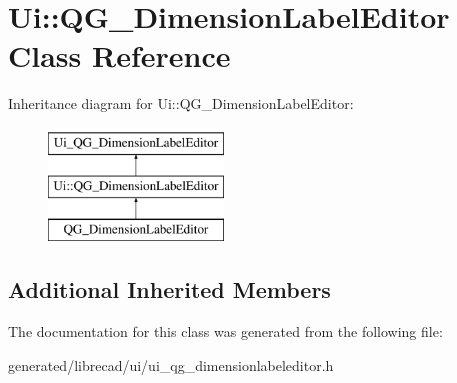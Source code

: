 \hypertarget{classUi_1_1QG__DimensionLabelEditor}{\section{Ui\-:\-:Q\-G\-\_\-\-Dimension\-Label\-Editor Class Reference}
\label{classUi_1_1QG__DimensionLabelEditor}
}
Inheritance diagram for Ui\-:\-:Q\-G\-\_\-\-Dimension\-Label\-Editor\-:\begin{figure}[H]
\begin{center}
\leavevmode
\includegraphics[height=3.000000cm]{classUi_1_1QG__DimensionLabelEditor}
\end{center}
\end{figure}
\subsection*{Additional Inherited Members}


The documentation for this class was generated from the following file\-:\begin{DoxyCompactItemize}
\item 
generated/librecad/ui/ui\-\_\-qg\-\_\-dimensionlabeleditor.\-h\end{DoxyCompactItemize}
